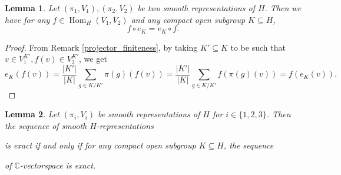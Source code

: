 \documentclass[8pt]{article}
\newtheorem{lemma}{Lemma}[section]
\DeclareMathOperator{\Hom}{Hom}
\newcommand{\C}[0]{\mathbb{C}}
\begin{document}
\begin{lemma}
Let $(\pi_1,V_1),(\pi_2,V_2)$ be two smooth representations of $H$. Then we have for any $f\in \Hom_H(V_1,V_2)$ and any compact open subgroup $K\subseteq H$,
\begin{equation*}
f\circ e_K = e_K\circ f.
\end{equation*}
\label{commutativity_projector}
\end{lemma}

\begin{proof}
From Remark \ref{projector_finiteness}, by taking $K' \subseteq K$ to be such that $v\in V_1^{K'},f(v)\in V_2^{K'}$, we get
\begin{equation*}
e_K(f(v)) = {\frac {\vert K'\vert} {\vert K\vert}}\sum_{g\in K/K'}\pi(g)(f(v)) = {\frac {\vert K'\vert} {\vert K\vert}}\sum_{g\in K/K'}f(\pi(g)(v)) = f(e_K(v)).
\end{equation*}
\end{proof}

\begin{lemma}
  \label{lemma_7}
Let $(\pi_i,V_i)$ be smooth representations of $H$ for $i\in\{1,2,3\}$. Then the sequence of smooth $H$-representations 
\begin{center}
\end{center}
is exact if and only if for any compact open subgroup $K\subseteq H$, the sequence 
\begin{center}
\end{center}
of $\C$-vectorspace is exact.
\label{exactness_representation}
\end{lemma}
\end{document}
